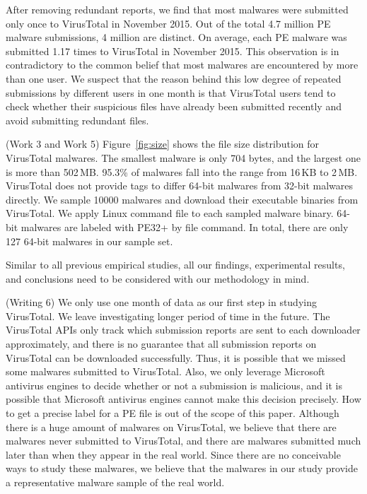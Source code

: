 After removing redundant reports, we find that most malwares were submitted only once to VirusTotal in November 2015. 
Out of the total 4.7 million PE malware submissions, 4 million are distinct. 
On average, each PE malware was submitted 1.17 times to VirusTotal in November 2015. 
This observation is in contradictory to the common belief that most malwares are encountered by more than one user.
We suspect that the reason behind this low degree of repeated submissions by different users in one month
is that VirusTotal users
tend to check whether their suspicious files have already been submitted recently
and avoid submitting redundant files.

{\color{red} (Work 3 and Work 5)
Figure~\ref{fig:size} shows the file size distribution for VirusTotal malwares. 
The smallest malware is only 704 bytes, and the largest one is more than 502\,MB. 
95.3\% of malwares fall into the range from 16\,KB to 2\,MB. 
VirusTotal does not provide tags to differ 64-bit malwares from 32-bit malwares directly. 
We sample 10000 malwares and download their executable binaries from VirusTotal.
We apply Linux command file to each sampled malware binary. 
64-bit malwares are labeled with PE32+ by file command. 
In total, there are only 127 64-bit malwares in our sample set. 
}

Similar to all previous empirical studies, all our findings, experimental results, 
and conclusions need to be considered with our methodology in mind. 

{\color{red} (Writing 6)
We only use one month of data as our first step in studying VirusTotal. 
We leave investigating longer period of time in the future. 
}
The VirusTotal APIs only track which submission reports are sent to each downloader approximately, 
and there is no guarantee that all submission reports on VirusTotal can be downloaded successfully. 
Thus, it is possible that we missed some malwares submitted to VirusTotal. 
Also, we only leverage Microsoft antivirus engines to decide whether or not a submission is malicious, 
and it is possible that Microsoft antivirus engines cannot make this decision precisely. 
How to get a precise label for a PE file is out of the scope of this paper.  
Although there is a huge amount of malwares on VirusTotal, we believe that there are malwares never submitted to VirusTotal, 
and there are malwares submitted much later than when they appear in the real world.
Since there are no conceivable ways to study these malwares,
we believe that the malwares in our study provide a representative malware sample of the real world. 



